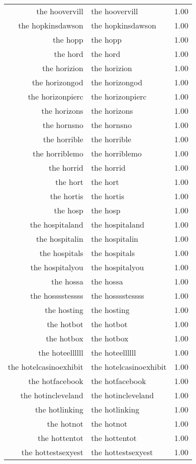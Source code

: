 \begin{table}[ht]
\begin{tabular}{rlr}
  the hoovervill & the hoovervill & 1.00 \\ 
  the hopkinsdawson & the hopkinsdawson & 1.00 \\ 
  the hopp & the hopp & 1.00 \\ 
  the hord & the hord & 1.00 \\ 
  the horizion & the horizion & 1.00 \\ 
  the horizongod & the horizongod & 1.00 \\ 
  the horizonpierc & the horizonpierc & 1.00 \\ 
  the horizons & the horizons & 1.00 \\ 
  the hornsno & the hornsno & 1.00 \\ 
  the horrible & the horrible & 1.00 \\ 
  the horriblemo & the horriblemo & 1.00 \\ 
  the horrid & the horrid & 1.00 \\ 
  the hort & the hort & 1.00 \\ 
  the hortis & the hortis & 1.00 \\ 
  the hosp & the hosp & 1.00 \\ 
  the hospitaland & the hospitaland & 1.00 \\ 
  the hospitalin & the hospitalin & 1.00 \\ 
  the hospitals & the hospitals & 1.00 \\ 
  the hospitalyou & the hospitalyou & 1.00 \\ 
  the hossa & the hossa & 1.00 \\ 
  the hosssstessss & the hosssstessss & 1.00 \\ 
  the hosting & the hosting & 1.00 \\ 
  the hotbot & the hotbot & 1.00 \\ 
  the hotbox & the hotbox & 1.00 \\ 
  the hoteellllll & the hoteellllll & 1.00 \\ 
  the hotelcasinoexhibit & the hotelcasinoexhibit & 1.00 \\ 
  the hotfacebook & the hotfacebook & 1.00 \\ 
  the hotincleveland & the hotincleveland & 1.00 \\ 
  the hotlinking & the hotlinking & 1.00 \\ 
  the hotnot & the hotnot & 1.00 \\ 
  the hottentot & the hottentot & 1.00 \\ 
  the hottestsexyest & the hottestsexyest & 1.00 \\ 

\end{tabular}
\end{table}
